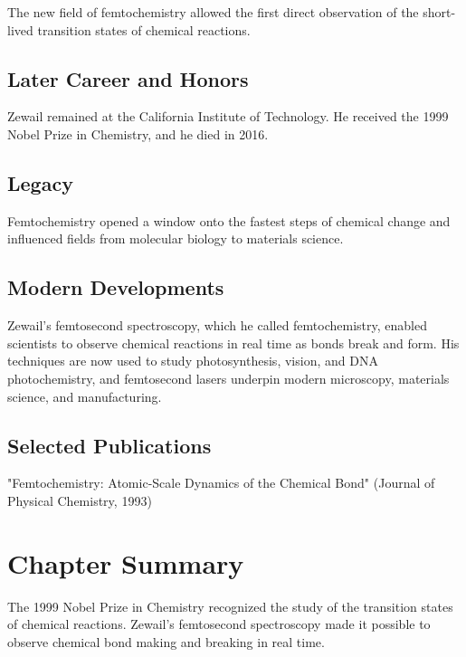 The new field of femtochemistry allowed the first direct observation of the short-lived transition states of chemical reactions.

\subsection*{Later Career and Honors}

Zewail remained at the California Institute of Technology. He received the 1999 Nobel Prize in Chemistry, and he died in 2016.

\subsection*{Legacy}

Femtochemistry opened a window onto the fastest steps of chemical change and influenced fields from molecular biology to materials science.

\subsection*{Modern Developments}

Zewail's femtosecond spectroscopy, which he called femtochemistry, enabled scientists to observe chemical reactions in real time as bonds break and form. His techniques are now used to study photosynthesis, vision, and DNA photochemistry, and femtosecond lasers underpin modern microscopy, materials science, and manufacturing.

\subsection*{Selected Publications}

"Femtochemistry: Atomic-Scale Dynamics of the Chemical Bond" (Journal of Physical Chemistry, 1993)

\clearpage

\section*{Chapter Summary}

The 1999 Nobel Prize in Chemistry recognized the study of the transition states of chemical reactions. Zewail's femtosecond spectroscopy made it possible to observe chemical bond making and breaking in real time.

